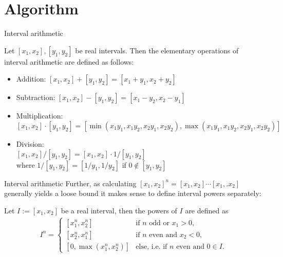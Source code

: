 \documentclass[german,10pt,xcolor=colortbl,compress,handout]{beamer}
\begin{document}
\section{Algorithm}
\begin{frame}{Interval arithmetic}
    \begin{definition}
    Let $[x_1,x_2], [y_1,y_2]$ be real intervals. Then the elementary operations of interval arithmetic are defined as follows:
        \begin{itemize}
            \item Addition: $[x_1,x_2] + [y_1,y_2] = [x_1+y_1,x_2+y_2]$
            \item Subtraction: $[x_1,x_2] - [y_1,y_2] = [x_1-y_2,x_2-y_1]$
            \item Multiplication: $[x_1,x_2] \cdot [y_1,y_2] = [\min(x_1y_1,x_1y_2,x_2y_1,x_2y_2), \max(x_1y_1,x_1y_2,x_2y_1,x_2y_2)]$
            \item Division: \\ $[x_1,x_2] / [y_1,y_2] = [x_1,x_2] \cdot 1/[y_1,y_2]$ \\where $1/[y_1,y_2]= [1/y_1, 1/y_2]$ if $0 \notin [y_1,y_2] $
        \end{itemize}
    \end{definition}
\end{frame}

\begin{frame}{Interval arithmetic}
    Further, as calculating $[x_1,x_2]^n = [x_1, x_2] \cdots [x_1,. x_2]$ generally yields a
    loose bound it makes sense to define interval powers separately:
    \begin{definition}
        Let $I := [x_1, x_2]$ be a real interval, then the powers of $I$ are defined
        as
        \begin{align*}
            I^n =
            \begin{cases}
                [x_1^n, x_2^n] & \text{if $n$ odd or $x_1 > 0$,} \\
                [x_2^n, x_1^n] & \text{if $n$ even and $x_2 < 0$,} \\
                [0, \max(x_1^n, x_2^n)] & \text{else, i.e. if $n$ even and $0\in I$.}
            \end{cases}
        \end{align*}
    \end{definition}
\end{frame}
\end{document}
